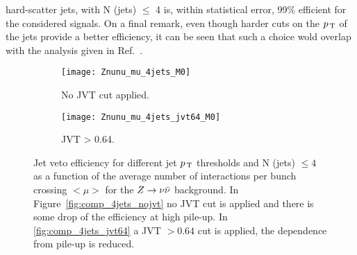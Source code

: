 hard-scatter jets, with N (jets) $\leq$ 4 is, within statistical error, 99\%
efficient for the considered signals. On a final remark, even though harder cuts
on the $p_\mathrm{\, T}$ of the jets provide a better efficiency, it can be seen that such a
choice wold overlap with the analysis given in Ref.~\cite{MultijetSUSY}.
\begin{figure}[!h]
  \centering
  \begin{subfigure}[t]{.48\linewidth}
    \texttt{[image: Znunu\_mu\_4jets\_M0]}
    \caption{No JVT cut applied.}
    \label{fig:znunu_4jets_jvt64}
  \end{subfigure}
  \begin{subfigure}[t]{.48\linewidth}
    \texttt{[image: Znunu\_mu\_4jets\_jvt64\_M0]}
    \caption{JVT > 0.64.}
    \label{fig:comp_4jets_jvt64_1}
  \end{subfigure}
  \caption{Jet veto efficiency for different jet $p_\mathrm{\, T}$ thresholds and N (jets)
    $\leq 4$ as a function of the average number of interactions per bunch
    crossing $<\mu>$ for the $Z \rightarrow \nu \bar{\nu}$ background. In
    Figure~\ref{fig:comp_4jets_nojvt} no JVT cut is applied and there is some
    drop of the efficiency at high pile-up. In \cref{fig:comp_4jets_jvt64} a JVT
    $> 0.64$ cut is applied, the dependence from pile-up is reduced.}
  \label{fig:jet_veto_comparison}
\end{figure}
